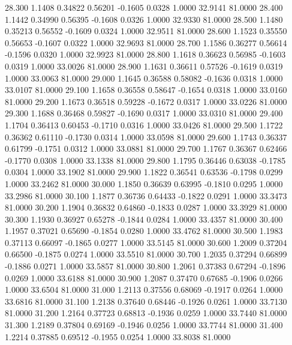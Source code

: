   28.300   1.1408   0.34822   0.56201  -0.1605   0.0328   1.0000  32.9141  81.0000
  28.400   1.1442   0.34990   0.56395  -0.1608   0.0326   1.0000  32.9330  81.0000
  28.500   1.1480   0.35213   0.56552  -0.1609   0.0324   1.0000  32.9511  81.0000
  28.600   1.1523   0.35550   0.56653  -0.1607   0.0322   1.0000  32.9693  81.0000
  28.700   1.1586   0.36277   0.56614  -0.1596   0.0320   1.0000  32.9923  81.0000
  28.800   1.1618   0.36623   0.56985  -0.1603   0.0319   1.0000  33.0026  81.0000
  28.900   1.1631   0.36611   0.57526  -0.1619   0.0319   1.0000  33.0063  81.0000
  29.000   1.1645   0.36588   0.58082  -0.1636   0.0318   1.0000  33.0107  81.0000
  29.100   1.1658   0.36558   0.58647  -0.1654   0.0318   1.0000  33.0160  81.0000
  29.200   1.1673   0.36518   0.59228  -0.1672   0.0317   1.0000  33.0226  81.0000
  29.300   1.1688   0.36468   0.59827  -0.1690   0.0317   1.0000  33.0310  81.0000
  29.400   1.1704   0.36413   0.60453  -0.1710   0.0316   1.0000  33.0426  81.0000
  29.500   1.1722   0.36362   0.61110  -0.1730   0.0314   1.0000  33.0598  81.0000
  29.600   1.1743   0.36337   0.61799  -0.1751   0.0312   1.0000  33.0881  81.0000
  29.700   1.1767   0.36367   0.62466  -0.1770   0.0308   1.0000  33.1338  81.0000
  29.800   1.1795   0.36446   0.63038  -0.1785   0.0304   1.0000  33.1902  81.0000
  29.900   1.1822   0.36541   0.63536  -0.1798   0.0299   1.0000  33.2462  81.0000
  30.000   1.1850   0.36639   0.63995  -0.1810   0.0295   1.0000  33.2986  81.0000
  30.100   1.1877   0.36736   0.64433  -0.1822   0.0291   1.0000  33.3473  81.0000
  30.200   1.1904   0.36832   0.64860  -0.1833   0.0287   1.0000  33.3929  81.0000
  30.300   1.1930   0.36927   0.65278  -0.1844   0.0284   1.0000  33.4357  81.0000
  30.400   1.1957   0.37021   0.65690  -0.1854   0.0280   1.0000  33.4762  81.0000
  30.500   1.1983   0.37113   0.66097  -0.1865   0.0277   1.0000  33.5145  81.0000
  30.600   1.2009   0.37204   0.66500  -0.1875   0.0274   1.0000  33.5510  81.0000
  30.700   1.2035   0.37294   0.66899  -0.1886   0.0271   1.0000  33.5857  81.0000
  30.800   1.2061   0.37383   0.67294  -0.1896   0.0269   1.0000  33.6188  81.0000
  30.900   1.2087   0.37470   0.67685  -0.1906   0.0266   1.0000  33.6504  81.0000
  31.000   1.2113   0.37556   0.68069  -0.1917   0.0264   1.0000  33.6816  81.0000
  31.100   1.2138   0.37640   0.68446  -0.1926   0.0261   1.0000  33.7130  81.0000
  31.200   1.2164   0.37723   0.68813  -0.1936   0.0259   1.0000  33.7440  81.0000
  31.300   1.2189   0.37804   0.69169  -0.1946   0.0256   1.0000  33.7744  81.0000
  31.400   1.2214   0.37885   0.69512  -0.1955   0.0254   1.0000  33.8038  81.0000
